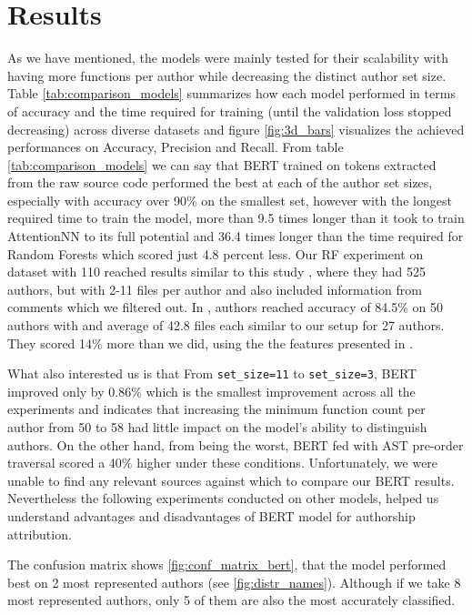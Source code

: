 \documentclass[conference]{IEEEtran}
\begin{document}
    
\section{Results}

As we have mentioned, the models were mainly tested for their scalability with having more functions per author while decreasing the distinct author set size.
Table \ref{tab:comparison_models} summarizes how each model performed in terms of accuracy and the time required for training (until the validation loss stopped decreasing) across diverse datasets
and figure \ref{fig:3d_bars} visualizes the achieved performances on Accuracy, Precision and Recall. From table \ref{tab:comparison_models} we can say that BERT 
trained on tokens extracted from the raw source code performed the best at each of the author set sizes, especially with accuracy over 90\% on the smallest set, however with the longest required time to train the model, more than 
9.5 times longer than it took to train AttentionNN to its full potential and 36.4 times longer than the time required for Random Forests which scored just 4.8 percent less. Our RF experiment on dataset with 110 reached results similar to this study \cite{rf1}, 
where they had 525 authors, but with 2-11 files per author and also included information from comments which we filtered out. In \cite{rf2}, authors reached accuracy of 84.5\% on 50 authors with and average of 42.8 files each similar to our setup for 
27 authors. They scored 14\% more than we did, using the the features presented in \cite{caliskan}.

What also interested us is that From \texttt{set\_size=11} to \texttt{set\_size=3}, BERT improved only by 0.86\% which is the smallest improvement across all the experiments and indicates that increasing the minimum function 
count per author from 50 to 58 had little impact on the model's ability to distinguish authors. 
On the other hand, from being the worst, BERT fed with AST pre-order traversal scored a 40\% higher under these conditions. Unfortunately, we were unable to find any relevant sources against which to compare our BERT results.
Nevertheless the following experiments conducted on other models, helped us understand advantages and disadvantages of BERT model for authorship attribution.

The confusion matrix shows \ref{fig:conf_matrix_bert}, that the model performed best on 2 most represented authors
(see \ref{fig:distr_names}). Although if we take 8 most represented authors, only 5 of them are also 
the most accurately classified.
\end{document}
